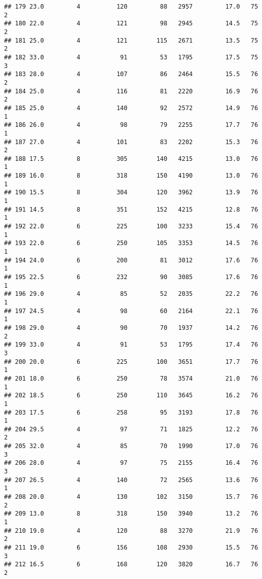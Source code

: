 \documentclass[
]{article}
\begin{document}
\begin{verbatim}
## 179 23.0         4          120         88   2957         17.0   75      2
## 180 22.0         4          121         98   2945         14.5   75      2
## 181 25.0         4          121        115   2671         13.5   75      2
## 182 33.0         4           91         53   1795         17.5   75      3
## 183 28.0         4          107         86   2464         15.5   76      2
## 184 25.0         4          116         81   2220         16.9   76      2
## 185 25.0         4          140         92   2572         14.9   76      1
## 186 26.0         4           98         79   2255         17.7   76      1
## 187 27.0         4          101         83   2202         15.3   76      2
## 188 17.5         8          305        140   4215         13.0   76      1
## 189 16.0         8          318        150   4190         13.0   76      1
## 190 15.5         8          304        120   3962         13.9   76      1
## 191 14.5         8          351        152   4215         12.8   76      1
## 192 22.0         6          225        100   3233         15.4   76      1
## 193 22.0         6          250        105   3353         14.5   76      1
## 194 24.0         6          200         81   3012         17.6   76      1
## 195 22.5         6          232         90   3085         17.6   76      1
## 196 29.0         4           85         52   2035         22.2   76      1
## 197 24.5         4           98         60   2164         22.1   76      1
## 198 29.0         4           90         70   1937         14.2   76      2
## 199 33.0         4           91         53   1795         17.4   76      3
## 200 20.0         6          225        100   3651         17.7   76      1
## 201 18.0         6          250         78   3574         21.0   76      1
## 202 18.5         6          250        110   3645         16.2   76      1
## 203 17.5         6          258         95   3193         17.8   76      1
## 204 29.5         4           97         71   1825         12.2   76      2
## 205 32.0         4           85         70   1990         17.0   76      3
## 206 28.0         4           97         75   2155         16.4   76      3
## 207 26.5         4          140         72   2565         13.6   76      1
## 208 20.0         4          130        102   3150         15.7   76      2
## 209 13.0         8          318        150   3940         13.2   76      1
## 210 19.0         4          120         88   3270         21.9   76      2
## 211 19.0         6          156        108   2930         15.5   76      3
## 212 16.5         6          168        120   3820         16.7   76      2

\end{verbatim}
\end{document}
